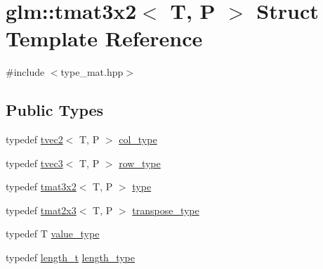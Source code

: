 \hypertarget{structglm_1_1tmat3x2}{}\section{glm\+::tmat3x2$<$ T, P $>$ Struct Template Reference}
\label{structglm_1_1tmat3x2}


{\ttfamily \#include $<$type\+\_\+mat.\+hpp$>$}

\subsection*{Public Types}
\begin{DoxyCompactItemize}
\item 
typedef \mbox{\hyperlink{structglm_1_1tvec2}{tvec2}}$<$ T, P $>$ \mbox{\hyperlink{structglm_1_1tmat3x2_a341f5be67463bce97692bc232312b7e8}{col\+\_\+type}}
\item 
typedef \mbox{\hyperlink{structglm_1_1tvec3}{tvec3}}$<$ T, P $>$ \mbox{\hyperlink{structglm_1_1tmat3x2_a54b0650d908b47bb1410661d9b049d90}{row\+\_\+type}}
\item 
typedef \mbox{\hyperlink{structglm_1_1tmat3x2}{tmat3x2}}$<$ T, P $>$ \mbox{\hyperlink{structglm_1_1tmat3x2_a170987a0b4f9663c8beeaca40042e0c8}{type}}
\item 
typedef \mbox{\hyperlink{structglm_1_1tmat2x3}{tmat2x3}}$<$ T, P $>$ \mbox{\hyperlink{structglm_1_1tmat3x2_a2ab17a834a083c22dae03db5057bc235}{transpose\+\_\+type}}
\item 
typedef T \mbox{\hyperlink{structglm_1_1tmat3x2_a68ba5fe1734aa7ee61cc637b5de9f696}{value\+\_\+type}}
\item 
typedef \mbox{\hyperlink{namespaceglm_a090a0de2260835bee80e71a702492ed9}{length\+\_\+t}} \mbox{\hyperlink{structglm_1_1tmat3x2_a358b949a615ed48c4dc18c53a55358df}{length\+\_\+type}}
\end{DoxyCompactItemize}
